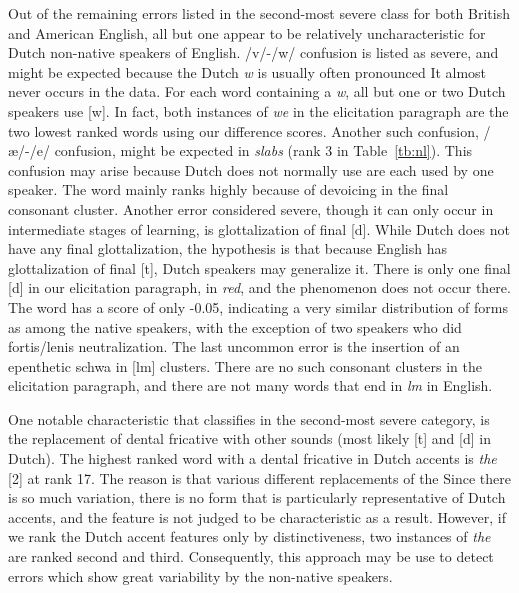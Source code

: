 \documentclass[output=paper]{LSP/langsci}
\begin{document}
Out of the remaining errors listed in the second-most severe class for both British and American English, all but one appear to be relatively uncharacteristic for Dutch non-native speakers of English. /v/-/w/ confusion is listed as severe, and might be expected because the Dutch \textit{w} is usually often pronounced 
It almost never occurs in the data. For each word containing a \textit{w}, all but one or two Dutch speakers use [w]. In fact, both instances of \textit{we} in the elicitation paragraph are the two lowest ranked words using our difference scores. Another such confusion, /æ/-/e/ confusion, might be expected in \textit{slabs} (rank 3 in Table~\ref{tb:nl}). This confusion may arise because Dutch does not normally use 
are each used by one speaker. The word mainly ranks highly because of devoicing in the final consonant cluster. Another error considered severe, though it can only occur in intermediate stages of learning, is glottalization of final [d]. While Dutch does not have any final glottalization, the hypothesis is that because English has glottalization of final [t], Dutch speakers may generalize it. There is only one final [d] in our elicitation paragraph, in \textit{red}, and the phenomenon does not occur there. The word has a score of only -0.05, indicating a very similar distribution of forms as among the native speakers, with the exception of two speakers who did fortis/lenis neutralization. The last uncommon error is the insertion of an epenthetic schwa in [lm] clusters. There are no such consonant clusters in the elicitation paragraph, and there are not many words that end in \textit{lm} in English.

One notable characteristic that \citet{van_den_doel_evaluation_2006} classifies in the second-most severe category, is the replacement of dental fricative with other sounds (most likely [t] and [d] in Dutch). The highest ranked word with a dental fricative in Dutch accents is \textit{the }[2] at rank 17. The reason is that various different replacements of the 
Since there is so much variation, there is no form that is particularly representative of Dutch accents, and the feature is not judged to be characteristic as a result. However, if we rank the Dutch accent features only by distinctiveness, two instances of \textit{the} are ranked second and third. Consequently, this approach may be use to detect errors which show great variability by the non-native speakers.
\end{document}
